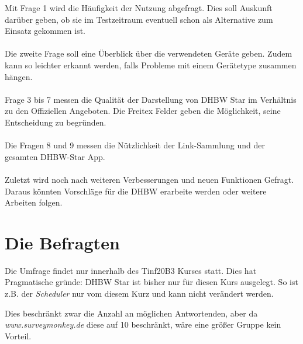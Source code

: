 Mit Frage 1 wird die Häufigkeit der Nutzung abgefragt. Dies soll Auskunft darüber geben, ob sie im Testzeitraum eventuell schon als Alternative zum Einsatz gekommen ist.
\\\\
Die zweite Frage soll eine Überblick über die verwendeten Geräte geben. Zudem kann so leichter erkannt werden, falls Probleme mit einem Gerätetype zusammen hängen.
\\\\
Frage 3 bis 7 messen die Qualität der Darstellung von DHBW Star im Verhältnis zu den Offiziellen Angeboten. Die Freitex Felder geben die Möglichkeit, seine Entscheidung zu begründen.
\\\\
Die Fragen 8 und 9 messen die Nützlichkeit der Link-Sammlung und der gesamten DHBW-Star App.
\\\\
Zuletzt wird noch nach weiteren Verbesserungen und neuen Funktionen Gefragt. Daraus könnten Vorschläge für die DHBW erarbeite werden oder weitere Arbeiten folgen.

\section{Die Befragten}
Die Umfrage findet nur innerhalb des Tinf20B3 Kurses statt. Dies hat Pragmatische gründe: DHBW Star ist bisher nur für diesen Kurs ausgelegt. So ist z.B. der \emph{Scheduler} nur vom diesem Kurz und kann nicht verändert werden.

Dies beschränkt zwar die Anzahl an möglichen Antwortenden, aber da \emph{www.surveymonkey.de} diese auf 10 beschränkt, wäre eine größer Gruppe kein Vorteil.




 
